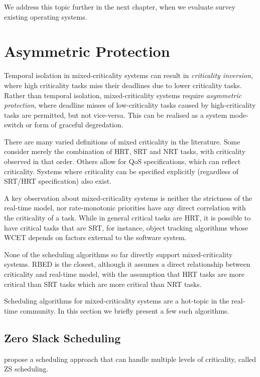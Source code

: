 We address this topic further in the next chapter, when we evaluate survey existing operating systems.

\section{Asymmetric Protection} 

Temporal isolation in mixed-criticality systems can result in \emph{criticality inversion}, where high criticality tasks miss their deadlines due to lower criticality tasks.
Rather than temporal isolation, mixed-criticality systems require \emph{asymmetric protection}, where deadline misses of low-criticality tasks caused by high-criticality tasks are permitted, but not vice-versa.
This can be realised as a system mode-switch or form of graceful degredation.

There are many varied definitions of mixed criticality in the literature.
Some consider merely the combination of \gls{HRT}, \gls{SRT} and \gls{NRT} tasks, with criticality observed in that order.
Others allow for \gls{QoS} specifications, which can reflect criticality.
Systems where criticality can be specified explicitly (regardless of SRT/HRT specification) also exist.

A key observation about mixed-criticality systems is neither the strictness of the real-time model, nor rate-monotonic priorities have any direct correlation with the criticality of a task.
While in general critical tasks are \gls{HRT}, it is possible to have critical tasks that are \gls{SRT}, for instance, object tracking algorithms whose \gls{WCET} depends on factors external to the software system.

None of the scheduling algorithms so far directly support mixed-criticality systems.
\gls{RBED} is the closest, although it assumes a direct relationship between criticality and real-time model, with the assumption that \gls{HRT} tasks are more critical than \gls{SRT} tasks which are more critical than \gls{NRT} tasks.

Scheduling algorithms for mixed-criticality systems are a hot-topic in the real-time community.
In this section we briefly present a few such algorithms.


\subsection{Zero Slack Scheduling}

 propose a scheduling approach that can handle multiple levels of criticality, called \gls{ZS} scheduling.

